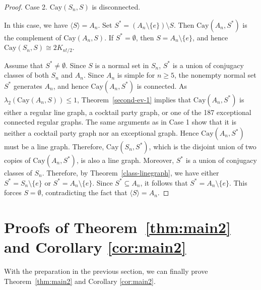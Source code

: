 \documentclass[12pt, a4paper]{article}
\theoremstyle{definition}
\begin{document}
\begin{proof}
\smallskip
\textsf{Case 2.} $\mathrm{Cay}(S_n,S)$ is disconnected.
\smallskip

In this case, we have $\langle S\rangle=A_n$. Set
\(
S^*=(A_n\setminus\{e\})\setminus S.
\)
Then $\mathrm{Cay}(A_n,S^*)$ is the complement of $\mathrm{Cay}(A_n,S)$. If $S^*=\emptyset$, then $S=A_n\setminus\{e\}$, and hence $\mathrm{Cay}(S_n,S)\cong 2K_{n!/2}$.

Assume that $S^*\neq\emptyset$. Since $S$ is a normal set in $S_n$, $S^*$ is a union of conjugacy classes of both $S_n$ and $A_n$. Since $A_n$ is simple for $n\ge 5$, the nonempty normal set $S^*$ generates $A_n$, and hence $\mathrm{Cay}(A_n,S^*)$ is connected.
As $\lambda_2(\mathrm{Cay}(A_n,S))\le 1$, Theorem~\ref{second-ev-1} implies that $\mathrm{Cay}(A_n,S^*)$ is either a regular line graph, a cocktail party graph, or one of the 187 exceptional connected regular graphs. The same arguments as in Case 1 show that it is neither a cocktail party graph nor an exceptional graph. Hence $\mathrm{Cay}(A_n,S^*)$ must be a line graph. Therefore, $\mathrm{Cay}(S_n,S^*)$, which is the disjoint union of two copies of $\mathrm{Cay}(A_n,S^*)$, is also a line graph.
Moreover, $S^*$ is a union of conjugacy classes of $S_n$. Therefore, by Theorem~\ref{class-linegraph}, we have either $S^*=S_n\setminus\{e\}$ or $S^*=A_n\setminus\{e\}$. Since $S^*\subseteq A_n$, it follows that $S^*=A_n\setminus\{e\}$. This forces $S=\emptyset$, contradicting the fact that $\langle S\rangle=A_n$.
\end{proof}


\section{Proofs of Theorem~\ref{thm:main2} and Corollary \ref{cor:main2}}
\label{supp-large}

With the preparation in the previous section, we can finally prove Theorem~\ref{thm:main2} and Corollary \ref{cor:main2}.
\end{document}

